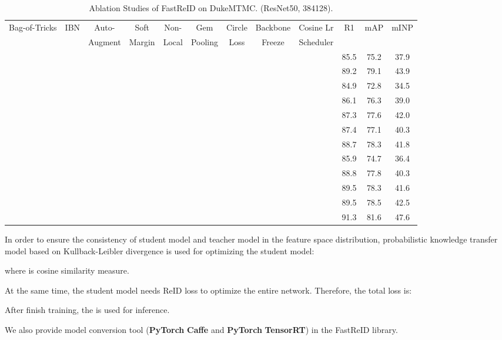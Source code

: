 \documentclass[10pt,twocolumn,letterpaper]{article}
\begin{document}
\begin{table*}[t]
\caption{Ablation Studies of FastReID on DukeMTMC. (ResNet50, 384128).}
\label{tab:table4}
\centering
  \fontsize{8}{8}\selectfont
  \label{tab4}
\begin{tabular}{|cccccccccccc|} \hline
    \multirow{2}{*}{Bag-of-Tricks} & \multirow{2}{*}{IBN} & Auto- & Soft & Non- & Gem & Circle & Backbone & Cosine Lr& \multirow{2}{*}{R1}& \multirow{2}{*}{mAP}& \multirow{2}{*}{mINP}\\ 
      &  & Augment & Margin & Local & Pooling &Loss & Freeze &Scheduler & & & \\ \hline
& & & & & & & & & 85.5& 75.2 &37.9\\ 
& & & & & & & & & 89.2 &79.1 &43.9\\ 
& & & & & & & & & 84.9 &72.8& 34.5\\ 
& & & & & & & & & 86.1 &76.3 &39.0\\ 
& & & & & & & & & 87.3 &77.6 &42.0\\ 
& & & & & & & & & 87.4 &77.1 &40.3\\ 
& & & & & & & & & 88.7 &78.3 &41.8\\ 
& & & & & & & & &  85.9& 74.7& 36.4\\ 
& & & & & & & & &  88.8 &77.8 &40.3\\ 
& & & & & & & & &  89.5& 78.3 &41.6\\ 
& & & & & & & & &  89.5 & 78.5& 42.5\\ 
& & & & & & &&&  91.3 &81.6& 47.6\\ \hline
\end{tabular}
\end{table*}








In order to ensure the consistency of student model and teacher model in the feature space distribution, probabilistic knowledge transfer model based on Kullback-Leibler divergence is used for optimizing the student model:

where  is cosine similarity measure.


At the same time, the student model needs ReID loss  to optimize the entire network. Therefore, the total loss is:

After finish training, the  is used for inference. 

We also provide model conversion tool (\textbf{PyTorch}  \textbf{Caffe} and \textbf{PyTorch}  \textbf{TensorRT})  in the FastReID library.
\end{document}
